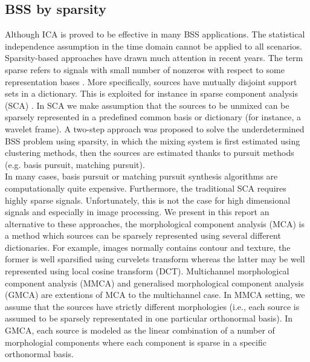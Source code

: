 \subsection{BSS by sparsity}
Although ICA is proved to be effective in many BSS applications. The statistical independence assumption in the time domain cannot be applied to all scenarios. Sparsity-based approaches have drawn much attention in recent years. The term sparse refers to signals with small number of nonzeros with respect to some representation bases \cite{ZibulevskyMichael2001BSSb}. More specifically, sources have mutually disjoint support sets in a dictionary. This is exploited for instance in sparse component analysis (SCA) \cite{SCA2005}. In SCA we make assumption that the sources to be unmixed can be sparsely represented in a predefined common basis or dictionary (for instance, a wavelet frame). A two-step approach \cite{BOFILL20012353} was proposed to solve the underdetermined BSS problem using sparsity, in which the mixing system is first estimated using clustering methods, then the sources are estimated thanks to pursuit methods (e.g. basis pursuit, matching pursuit).\\

In many cases, basis pursuit or matching pursuit synthesis algorithms are computationally quite expensive. Furthermore, the traditional SCA requires highly sparse signals. Unfortunately, this is not the case for high dimensional signals and especially in image processing. We present in this report an alternative to these approaches, the morphological component analysis (MCA) \cite{BobinJ_2007SaMD, BobinJ_2006Mdas} is a method which sources can be sparsely represented using several different dictionaries. For example, images normally contains contour and texture, the former is well sparsified using curvelets transform whereas the latter may be well represented using local cosine transform (DCT). 
Multichannel morphological component analysis (MMCA) \cite{Starck2005MorphologicalCA} and generalised morphological component analysis (GMCA) are extentions of MCA to the multichannel case. In MMCA setting, we assume that the sources have strictly different morphologies (i.e., each source is assumed to be sparsely representated in one particular orthonormal basis). In GMCA, each source is modeled as the linear combination of a number of morphologial components where each component is sparse in a specific orthonormal basis. 

